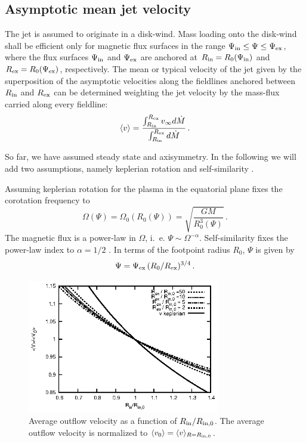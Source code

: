 \documentclass{emulateapj}
\begin{document}
\subsection{Asymptotic mean jet velocity}

The jet is assumed to originate in a disk-wind. Mass loading onto the disk-wind
shall be efficient only for magnetic flux surfaces in the range $\Psi_{\rm in}
\le \Psi \le \Psi_{\rm ex}$, where the flux surfaces $\Psi_{\rm in}$ and $\Psi_{\rm ex}$
are anchored at $R_{\rm in} = R_0(\Psi_{\rm in})$ and $R_{\rm ex} = R_0(\Psi_{\rm ex})$,
respectively.
The mean or typical velocity of the jet given by the
superposition of the asymptotic velocities along the fieldlines
anchored between $R_{\rm in}$ and $R_{\rm ex}$ can be determined
weighting the jet velocity by the mass-flux carried
along every fieldline:
%
\begin{equation}
 \langle v \rangle = \frac{\int_{R_{\rm in}}^{R_{\rm ex}} v_\infty d\dot{M}}
               {\int_{R_{\rm in}}^{R_{\rm ex}} d\dot{M}} \,.
 \label{eq:var}
\end{equation}

%
So far, we have assumed steady state and axisymmetry. 
In the following we will add two
assumptions, namely keplerian rotation and self-similarity \cite[see e.g.][]{VT98}. 

Assuming keplerian rotation for the plasma in the equatorial plane
fixes the corotation frequency to
%
\begin{equation} \label{eq:Omega_final}
  \Omega(\Psi) = \Omega_0(R_0(\Psi)) = \sqrt{\frac{GM}{R_0^3(\Psi)}} \,.
\end{equation}
%
The magnetic flux is a power-law in $\Omega$, i.~e. $\Psi \sim
\Omega^{-\alpha}$. Self-similarity fixes the power-law
index to $\alpha = 1/2$ \citep{bla82}.
In terms of the footpoint radius $R_0$, $\Psi$ is given by
\begin{equation}
  \Psi = \Psi_{\rm ex} \, (R_0/R_{\rm ex})^{3/4} \,.
  \label{eq:psi}
\end{equation}

\begin{figure}
 \centering
 \includegraphics[width=84mm]{f1.eps}
  \caption{Average outflow velocity as a function of $R_{\rm in}/R_{\rm in,0}$.
           The average outflow velocity is normalized to $\langle v_0 \rangle = \langle v \rangle_{R=R_{\rm in,0}}$.}
  \label{fig2}
\end{figure}
\end{document}
